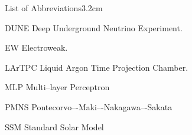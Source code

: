 \begin{mclistof}{List of Abbreviations}{3.2cm}

\item[DUNE] Deep Underground Neutrino Experiment. 

\item[EW] Electroweak.

\item[LArTPC] Liquid Argon Time Projection Chamber. 

\item[MLP] Multi--layer Perceptron

\item[PMNS] Pontecorvo–-Maki–-Nakagawa–-Sakata

\item[SSM] Standard Solar Model

\end{mclistof} 
